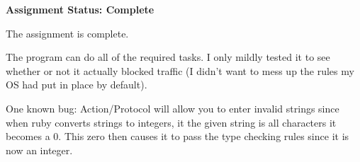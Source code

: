 \documentclass[11pt]{memo}
\begin{document}
\USM

\Date{\today}

\begin{memo}

\textbf{Assignment Status: Complete}

The assignment is complete.

The program can do all of the required tasks.  I only mildly tested it to see whether or not it actually blocked traffic (I didn't want to mess up the rules my OS had put in place by default).

One known bug: Action/Protocol will allow you to enter invalid strings since when ruby converts strings to integers, it the given string is all characters it becomes a 0.  This zero then causes it to pass the type checking rules since it is now an integer.

\end{memo}
\end{document}
